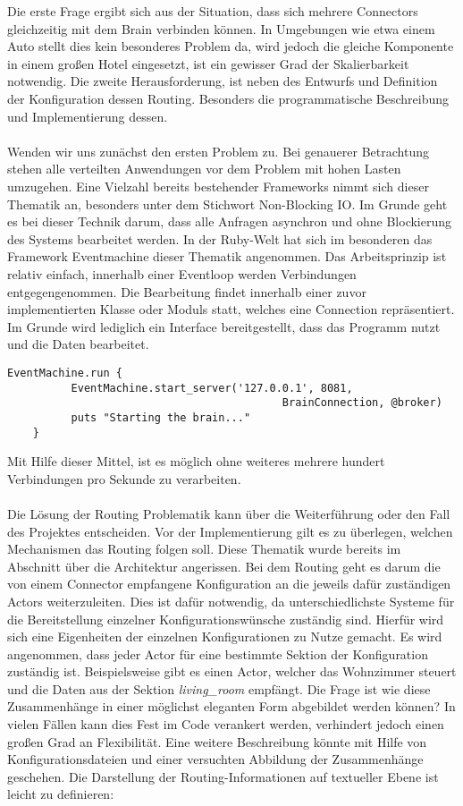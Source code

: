 Die erste Frage ergibt sich aus der Situation, dass sich mehrere Connectors gleichzeitig mit dem Brain verbinden können. In Umgebungen wie etwa einem Auto stellt dies kein besonderes Problem da, wird jedoch die gleiche Komponente in einem großen Hotel eingesetzt, ist ein gewisser Grad der Skalierbarkeit notwendig. Die zweite Herausforderung, ist neben des Entwurfs und Definition der Konfiguration dessen Routing. Besonders die programmatische Beschreibung und Implementierung dessen. 
\\\\
Wenden wir uns zunächst den ersten Problem zu. Bei genauerer Betrachtung stehen alle verteilten Anwendungen vor dem Problem mit hohen Lasten umzugehen. Eine Vielzahl bereits bestehender Frameworks nimmt sich dieser Thematik an, besonders unter dem Stichwort Non-Blocking IO. Im Grunde geht es bei dieser Technik darum, dass alle Anfragen asynchron und ohne Blockierung des Systems bearbeitet werden. In der Ruby-Welt hat sich im besonderen das Framework Eventmachine dieser Thematik angenommen. Das Arbeitsprinzip ist relativ einfach, innerhalb einer Eventloop werden Verbindungen entgegengenommen. Die Bearbeitung findet innerhalb einer zuvor implementierten Klasse oder Moduls statt, welches eine Connection repräsentiert. Im Grunde wird lediglich ein Interface bereitgestellt, dass das Programm nutzt und die Daten bearbeitet. 

\lstset{language=Ruby}
\begin{lstlisting}[caption=Server-Initialisierung des Brain, captionpos=b]
	EventMachine.run {
		  EventMachine.start_server('127.0.0.1', 8081, 
									       BrainConnection, @broker)
		  puts "Starting the brain..."
	}
\end{lstlisting}

Mit Hilfe dieser Mittel, ist es möglich ohne weiteres mehrere hundert Verbindungen pro Sekunde zu verarbeiten. 
\\\\
Die Lösung der Routing Problematik kann über die Weiterführung oder den Fall des Projektes entscheiden. Vor der Implementierung gilt es zu überlegen, welchen Mechanismen das Routing folgen soll. Diese Thematik wurde bereits im Abschnitt über die Architektur angerissen. Bei dem Routing geht es darum die von einem Connector empfangene Konfiguration an die jeweils dafür zuständigen Actors weiterzuleiten. Dies ist dafür notwendig, da unterschiedlichste Systeme für die Bereitstellung einzelner Konfigurationswünsche zuständig sind. Hierfür wird sich eine Eigenheiten der einzelnen Konfigurationen zu Nutze gemacht. Es wird angenommen, dass jeder Actor für eine bestimmte Sektion der Konfiguration zuständig ist. Beispielsweise gibt es einen Actor, welcher das Wohnzimmer steuert und die Daten aus der Sektion \emph{living\_room} empfängt. Die Frage ist wie diese Zusammenhänge in einer möglichst eleganten Form abgebildet werden können? 
In vielen Fällen kann dies Fest im Code verankert werden, verhindert jedoch einen großen Grad an Flexibilität. Eine weitere Beschreibung könnte mit Hilfe von Konfigurationsdateien und einer versuchten Abbildung der Zusammenhänge geschehen. Die Darstellung der Routing-Informationen auf textueller Ebene ist leicht zu definieren: 

